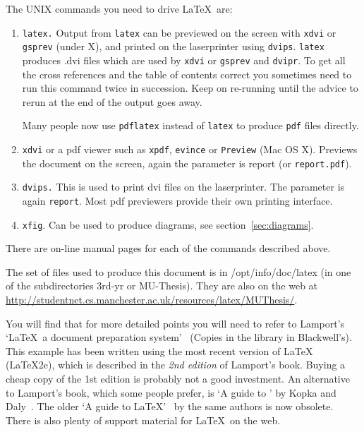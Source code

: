 The UNIX commands you need to drive \LaTeX\ are:
\begin{enumerate}
	\item \texttt{latex.} Output from \texttt{latex} can be previewed on
	      the screen with \texttt{xdvi} or \texttt{gsprev} (under X), and printed on the laserprinter using  \texttt{dvips}.
	      \texttt{latex} produces \textsf{.dvi} files which are used by
	      \texttt{xdvi} or \texttt{gsprev} and \texttt{dvipr}.  To get all the
	      cross references and the table of contents correct you sometimes
	      need to run this command twice in succession.  Keep on re-running
	      until the advice to rerun at the end of the output goes away.

	      Many people now use \texttt{pdflatex} instead of \texttt{latex} to produce \texttt{pdf} files directly.

	\item \texttt{xdvi} or a pdf viewer such as \texttt{xpdf}, \texttt{evince} or \texttt{Preview} (Mac OS X). Previews the document on the
	      screen, again the parameter is \textsf{report} (or \texttt{report.pdf}).

	\item \texttt{dvips.} This is used to print dvi files on the laserprinter.  The
	      parameter is again \texttt{report}. Most pdf previewers provide their own printing interface.

	\item \texttt{xfig}. Can be used to produce diagrams, see
	      section~\ref{sec:diagrams}.

\end{enumerate}
There are on-line manual pages for each of the commands described above.

The set of files used to produce this document is in
\textsf{/opt/info/doc/latex} (in one of the subdirectories
\textsf{3rd-yr} or \textsf{MU-Thesis}).  They are also on the web at \url{http://studentnet.cs.manchester.ac.uk/resources/latex/MUThesis/}.

You will find that for more detailed points you will need to refer to
Lamport's `\LaTeX\ a document preparation system'~\cite{lamport}
(Copies in the library  in Blackwell's).
This example has been written using the most recent version of \LaTeX
(LaTeX2e), which is described in the \emph{2nd edition} of Lamport's
book. Buying a cheap copy of the 1st edition is probably not a good
investment. An alternative to Lamport's book, which some people
prefer, is `A guide to {\LaTeXe}' by Kopka and Daly~\cite{kopka}. The
older `A guide to {\LaTeX}'~\cite{kopka-old} by the same authors is
now obsolete. There is also plenty of support material for \LaTeX\ on the web.

